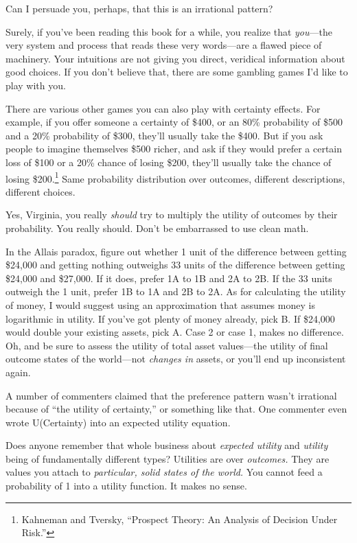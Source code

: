 {
 Can I persuade you, perhaps, that this is an irrational pattern?}

{
 Surely, if you've been reading this book for a
while, you realize that \textit{you}{}---the very system and process
that reads these very words---are a flawed piece of machinery. Your
intuitions are not giving you direct, veridical information about good
choices. If you don't believe that, there are some
gambling games I'd like to play with you.}

{
 There are various other games you can also play with certainty
effects. For example, if you offer someone a certainty of \$400, or an
80\% probability of \$500 and a 20\% probability of \$300,
they'll usually take the \$400. But if you ask people
to imagine themselves \$500 richer, and ask if they would prefer a
certain loss of \$100 or a 20\% chance of losing \$200,
they'll usually take the chance of losing
\$200.\footnote{Kahneman and Tversky, ``Prospect Theory: An
Analysis of Decision Under Risk.''} Same probability distribution over outcomes,
different descriptions, different choices.}

{
 Yes, Virginia, you really \textit{should} try to multiply the
utility of outcomes by their probability. You really should.
Don't be embarrassed to use clean math.}

{
 In the Allais paradox, figure out whether 1 unit of the difference
between getting \$24,000 and getting nothing outweighs 33 units of the
difference between getting \$24,000 and \$27,000. If it does, prefer 1A
to 1B and 2A to 2B. If the 33 units outweigh the 1 unit, prefer 1B to
1A and 2B to 2A. As for calculating the utility of money, I would
suggest using an approximation that assumes money is logarithmic in
utility. If you've got plenty of money already, pick B.
If \$24,000 would double your existing assets, pick A. Case 2 or case
1, makes no difference. Oh, and be sure to assess the utility of total
asset values---the utility of final outcome states of the world---not
\textit{changes in} assets, or you'll end up
inconsistent again.}

{
 A number of commenters claimed that the preference pattern
wasn't irrational because of ``the
utility of certainty,'' or something like that. One
commenter even wrote U(Certainty) into an expected utility equation.}

{
 Does anyone remember that whole business about \textit{expected
utility} and \textit{utility} being of fundamentally different types?
Utilities are over \textit{outcomes.} They are values you attach to
\textit{particular, solid states of the world.} You cannot feed a
probability of 1 into a utility function. It makes no sense.}

